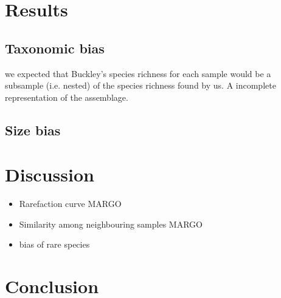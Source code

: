 \documentclass[a4paper]{article}
\begin{document}

\section{Results}


	\subsection{Taxonomic bias} we expected that Buckley's species richness for each sample would be a subsample (i.e. nested) of the species richness found by us. A incomplete representation of the assemblage.

	\subsection{Size bias}






\section{Discussion}

\begin{itemize}
\item Rarefaction curve MARGO
\item Similarity among neighbouring samples MARGO
\item bias of rare species
\end{itemize}





\section{Conclusion}



\label{Bibliography}
\end{document}
